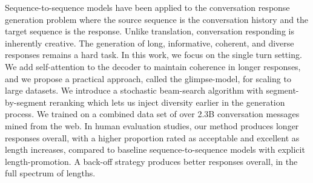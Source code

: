 Sequence-to-sequence models have been applied to the conversation response generation problem where the source sequence is the conversation history and the target sequence is the response. Unlike translation, conversation responding is inherently creative. The generation of long, informative, coherent, and diverse responses remains a hard task. In this work, we focus on the single turn setting. We add self-attention to the decoder to maintain coherence in longer responses, and we propose a practical approach, called the glimpse-model, for scaling to large datasets. We introduce a stochastic beam-search algorithm with segment-by-segment reranking which lets us inject diversity earlier in the generation process. We trained on a combined data set of over 2.3B conversation messages mined from the web. In human evaluation studies, our method produces longer responses overall, with a higher proportion rated as acceptable and excellent as length increases, compared to baseline sequence-to-sequence models with explicit length-promotion. A back-off strategy produces better responses overall, in the full spectrum of lengths.
